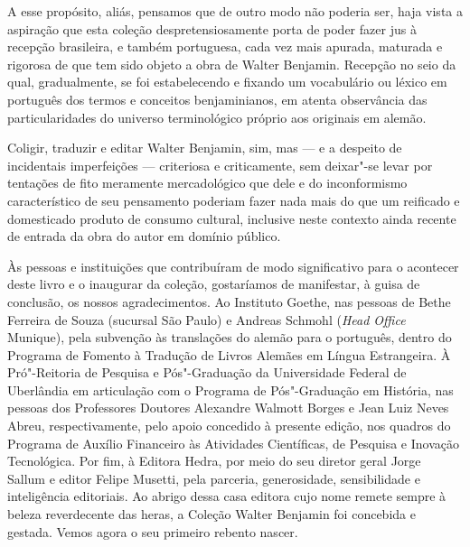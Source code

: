 A esse propósito, aliás, pensamos que de outro modo não poderia ser,
haja vista a aspiração que esta coleção despretensiosamente porta de
poder fazer jus à recepção brasileira, e também portuguesa, cada vez
mais apurada, maturada e rigorosa de que tem sido objeto a obra de
Walter Benjamin. Recepção no seio da qual, gradualmente, se foi
estabelecendo e fixando um vocabulário ou léxico em português dos termos
e conceitos benjaminianos, em atenta observância das particularidades do
universo terminológico próprio aos originais em alemão.

Coligir, traduzir e editar Walter Benjamin, sim, mas --- e a despeito de
incidentais imperfeições --- criteriosa e criticamente, sem deixar"-se
levar por tentações de fito meramente mercadológico que dele e do
inconformismo característico de seu pensamento poderiam fazer nada mais
do que um reificado e domesticado produto de consumo cultural, inclusive
neste contexto ainda recente de entrada da obra do autor em domínio
público.

Às pessoas e instituições que contribuíram de modo
significativo para o acontecer deste livro e o inaugurar da coleção,
gostaríamos de manifestar, à guisa de conclusão, os nossos
agradecimentos. Ao Instituto Goethe, nas pessoas de Bethe Ferreira de
Souza (sucursal São Paulo) e Andreas Schmohl (\emph{Head Office}
Munique), pela subvenção às translações do alemão para o português,
dentro do Programa de Fomento à Tradução de Livros Alemães em Língua
Estrangeira. À Pró"-Reitoria de Pesquisa e Pós"-Graduação da Universidade
Federal de Uberlândia em articulação com o Programa de Pós"-Graduação em
História, nas pessoas dos Professores Doutores Alexandre Walmott Borges
e Jean Luiz Neves Abreu, respectivamente, pelo apoio concedido à
presente edição, nos quadros do Programa de Auxílio Financeiro às
Atividades Científicas, de Pesquisa e Inovação Tecnológica. Por fim, à
Editora Hedra, por meio do seu diretor geral Jorge Sallum e editor Felipe Musetti, pela
parceria, generosidade, sensibilidade e inteligência editoriais. Ao
abrigo dessa casa editora cujo nome remete sempre à beleza reverdecente
das heras, a Coleção Walter Benjamin foi concebida e gestada. Vemos
agora o seu primeiro rebento nascer.





